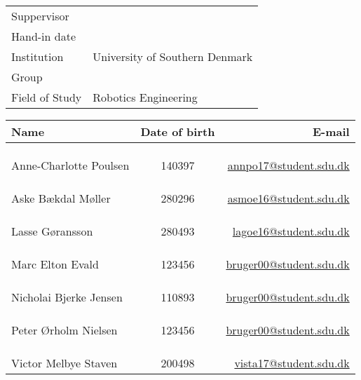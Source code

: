 \documentclass[../main.tex]{subfiles}
\begin{document}
\phantom{g}
\vspace{0.5cm}
\noindent
\begin{center}
\begin{Huge}
\textbf{\titel}
\end{Huge}
\\
\begin{huge}
\subtitel
\end{huge}
\\
\vspace{1cm}



\vspace{.7cm}

\begin{tabular}{@{} l l @{}}
\hline
Suppervisor         		&	\vejleder          	\\
Hand-in date 			& 	\dato				\\
Institution             	&   	University of Southern Denmark	\\
Group                  		&	\gruppe				\\
Field of Study           	& 	Robotics Engineering	\\
\hline
\end{tabular}
\thispagestyle{empty}

\vspace{1.5cm}


\newcommand{\fmedlem}[3]{%
\multicolumn{3}{c}{}\\
\multicolumn{3}{c}{}\\
\multicolumn{3}{c}{}\\
\hline
#1 & #2 & 	\href{mailto:#3@student.sdu.dk}{#3@student.sdu.dk}\\
}

\begin{tabular}{ l  c  r }

Name						& Date of birth &	E-mail \\
\hline
\fmedlem{Anne-Charlotte Poulsen}{140397}{annpo17}
\fmedlem{Aske Bækdal Møller}{280296}{asmoe16}
\fmedlem{Lasse Gøransson}{280493}{lagoe16}
\fmedlem{Marc Elton Evald}{123456}{bruger00}
\fmedlem{Nicholai Bjerke Jensen}{110893}{bruger00}
\fmedlem{Peter Ørholm Nielsen}{123456}{bruger00}
\fmedlem{Victor Melbye Staven}{200498}{vista17}
\end{tabular}
\end{center}
\end{document}
